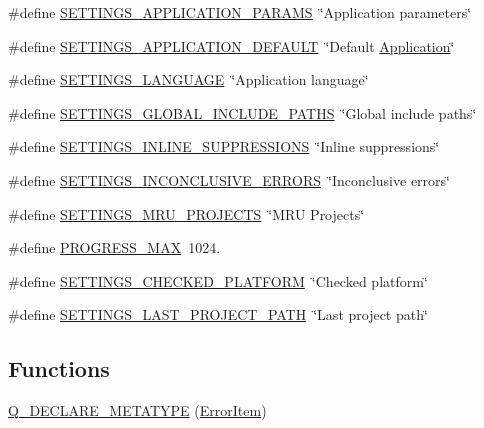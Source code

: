 \begin{DoxyCompactItemize}
\item 
\#define \hyperlink{group___g_u_i_gafcd95df40e49a13d72f2dc03688c2d12}{S\-E\-T\-T\-I\-N\-G\-S\-\_\-\-A\-P\-P\-L\-I\-C\-A\-T\-I\-O\-N\-\_\-\-P\-A\-R\-A\-M\-S}~\char`\"{}Application parameters\char`\"{}
\item 
\#define \hyperlink{group___g_u_i_ga9977f0596055a181e2a92b3f30a41960}{S\-E\-T\-T\-I\-N\-G\-S\-\_\-\-A\-P\-P\-L\-I\-C\-A\-T\-I\-O\-N\-\_\-\-D\-E\-F\-A\-U\-L\-T}~\char`\"{}Default \hyperlink{class_application}{Application}\char`\"{}
\item 
\#define \hyperlink{group___g_u_i_ga81e3fd8f29b03851695852dc1d90c2f9}{S\-E\-T\-T\-I\-N\-G\-S\-\_\-\-L\-A\-N\-G\-U\-A\-G\-E}~\char`\"{}Application language\char`\"{}
\item 
\#define \hyperlink{group___g_u_i_gac45f33ac37595721fe492ea6d2ecf3e6}{S\-E\-T\-T\-I\-N\-G\-S\-\_\-\-G\-L\-O\-B\-A\-L\-\_\-\-I\-N\-C\-L\-U\-D\-E\-\_\-\-P\-A\-T\-H\-S}~\char`\"{}Global include paths\char`\"{}
\item 
\#define \hyperlink{group___g_u_i_ga27ffc5be3e4ec8b2da25ec45ab36dad7}{S\-E\-T\-T\-I\-N\-G\-S\-\_\-\-I\-N\-L\-I\-N\-E\-\_\-\-S\-U\-P\-P\-R\-E\-S\-S\-I\-O\-N\-S}~\char`\"{}Inline suppressions\char`\"{}
\item 
\#define \hyperlink{group___g_u_i_gaae45d537873fc5ab5b133870170794aa}{S\-E\-T\-T\-I\-N\-G\-S\-\_\-\-I\-N\-C\-O\-N\-C\-L\-U\-S\-I\-V\-E\-\_\-\-E\-R\-R\-O\-R\-S}~\char`\"{}Inconclusive errors\char`\"{}
\item 
\#define \hyperlink{group___g_u_i_ga9151be7cc4941019c9307821122464d9}{S\-E\-T\-T\-I\-N\-G\-S\-\_\-\-M\-R\-U\-\_\-\-P\-R\-O\-J\-E\-C\-T\-S}~\char`\"{}M\-R\-U Projects\char`\"{}
\item 
\#define \hyperlink{group___g_u_i_ga9819a49b96c50ee0a87bb8fde7e95417}{P\-R\-O\-G\-R\-E\-S\-S\-\_\-\-M\-A\-X}~1024.
\item 
\#define \hyperlink{group___g_u_i_ga610ca6768d06c867b8d3844183ccd4b1}{S\-E\-T\-T\-I\-N\-G\-S\-\_\-\-C\-H\-E\-C\-K\-E\-D\-\_\-\-P\-L\-A\-T\-F\-O\-R\-M}~\char`\"{}Checked platform\char`\"{}
\item 
\#define \hyperlink{group___g_u_i_gab57ba2008763c4193bccdff888c05492}{S\-E\-T\-T\-I\-N\-G\-S\-\_\-\-L\-A\-S\-T\-\_\-\-P\-R\-O\-J\-E\-C\-T\-\_\-\-P\-A\-T\-H}~\char`\"{}Last project path\char`\"{}
\end{DoxyCompactItemize}
\subsection*{Functions}
\begin{DoxyCompactItemize}
\item 
\hyperlink{group___g_u_i_ga106a9711f30fb9676348d98d9e4e0d35}{Q\-\_\-\-D\-E\-C\-L\-A\-R\-E\-\_\-\-M\-E\-T\-A\-T\-Y\-P\-E} (\hyperlink{class_error_item}{Error\-Item})
\end{DoxyCompactItemize}


